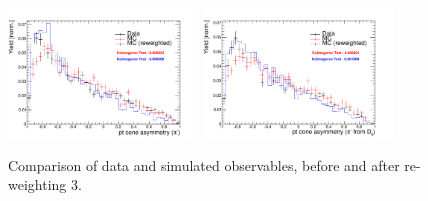 \begin{figure}[h!]
\includegraphics[height=6.cm,width=0.45\textwidth]{figs/MC-v-Data/pi_minus_ptasy_1_00.pdf}
\includegraphics[height=6.cm,width=0.45\textwidth]{figs/MC-v-Data/pi_minus_fromDs_ptasy_1_00.pdf}
\caption{Comparison of data and simulated observables, before and after re-weighting 3.}
\end{figure}









\FloatBarrier
